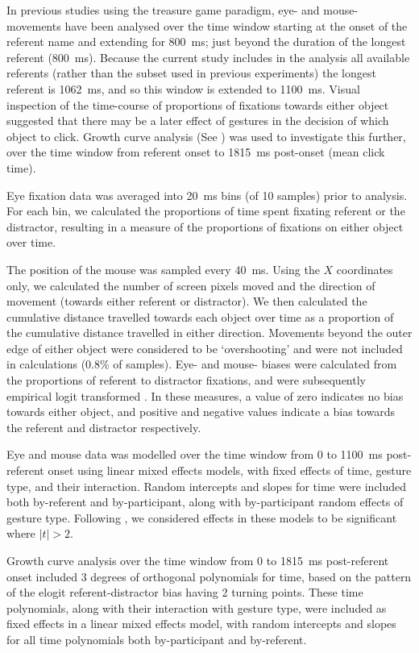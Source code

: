 \documentclass[a4paper,man,natbib]{apa6}
\begin{document}
In previous studies using the treasure game paradigm, eye- and mouse- movements have been analysed over the time window starting at the onset of the referent name and extending for 800~ms; just beyond the duration of the longest referent (800~ms). 
Because the current study includes in the analysis all available referents (rather than the subset used in previous experiments) the longest referent is 1062~ms, and so this window is extended to 1100~ms.
Visual inspection of the time-course of proportions of fixations towards either object suggested that there may be a later effect of gestures in the decision of which object to click. 
Growth curve analysis (See \citealt{Mirman2008}) was used to investigate this further, over the time window from referent onset to 1815~ms post-onset (mean click time).

Eye fixation data was averaged into 20~ms bins (of 10 samples) prior to analysis.
For each bin, we calculated the proportions of time spent fixating referent or the distractor, resulting in a measure of the proportions of fixations on either object over time.

The position of the mouse was sampled every 40~ms.
Using the $X$ coordinates only, we calculated the number of screen pixels moved and the direction of movement (towards either referent or distractor).
We then calculated the cumulative distance travelled towards each object over time as a proportion of the cumulative distance travelled in either direction.
Movements beyond the outer edge of either object were considered to be `overshooting' and were not included in calculations (0.8\% of samples).
Eye- and mouse- biases were calculated from the proportions of referent to distractor fixations, and were subsequently empirical logit transformed \citep{Barr2008}. 
In these measures, a value of zero indicates no bias towards either object, and positive and negative values indicate a bias towards the referent and distractor respectively.

Eye and mouse data was modelled over the time window from 0 to 1100~ms post-referent onset using linear mixed effects models, with fixed effects of time, gesture type, and their interaction.
Random intercepts and slopes for time were included both by-referent and by-participant, along with by-participant random effects of gesture type.
Following \citet{Baayen2008}, we considered effects in these models to be significant where $|t|>2$.

Growth curve analysis over the time window from 0 to 1815~ms post-referent onset included 3 degrees of orthogonal polynomials for time, based on the pattern of the elogit referent-distractor bias having 2 turning points. 
These time polynomials, along with their interaction with gesture type, were included as fixed effects in a linear mixed effects model, with random intercepts and slopes for all time polynomials both by-participant and by-referent.
\end{document}
